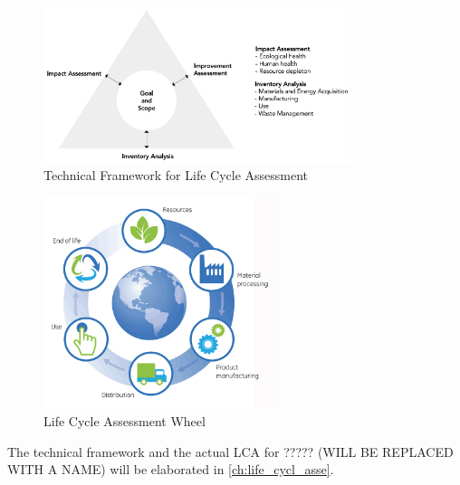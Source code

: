 \begin{figure}[H]
    \centering
    \includegraphics[width=0.8\textwidth]{ProjectApproach/Figures/LCAtriangle.pdf}
    \caption{Technical Framework for Life Cycle Assessment}
    \label{fig:lcatriangle}
\end{figure}

\begin{figure}[H]
    \centering
    \includegraphics[width=0.6\textwidth]{ProjectApproach/Figures/lcadiagram.jpg}
    \caption{Life Cycle Assessment Wheel}
    \label{fig:lcawheel}
\end{figure}

The technical framework and the actual LCA for ????? (WILL BE REPLACED WITH A NAME) will be elaborated in \autoref{ch:life_cycl_asse}.


